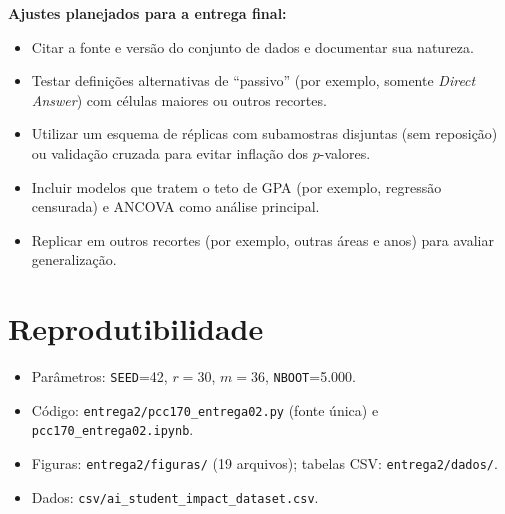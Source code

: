 \documentclass[12pt,a4paper]{article}
\begin{document}
\textbf{Ajustes planejados para a entrega final:}
\begin{itemize}
\item Citar a fonte e vers\~ao do conjunto de dados e documentar sua natureza.
\item Testar defini\c{c}\~oes alternativas de ``passivo'' (por exemplo, somente \emph{Direct Answer}) com c\'elulas maiores ou outros recortes.
\item Utilizar um esquema de r\'eplicas com subamostras disjuntas (sem reposi\c{c}\~ao) ou valida\c{c}\~ao cruzada para evitar infla\c{c}\~ao dos $p$-valores.
\item Incluir modelos que tratem o teto de GPA (por exemplo, regress\~ao censurada) e ANCOVA como an\'alise principal.
\item Replicar em outros recortes (por exemplo, outras \'areas e anos) para avaliar generaliza\c{c}\~ao.
\end{itemize}

\appendix
\section{Reprodutibilidade}
\begin{itemize}
\item Par\^ametros: \texttt{SEED}=42, $r=30$, $m=36$, \texttt{NBOOT}=5.000.
\item C\'odigo: \texttt{entrega2/pcc170\_entrega02.py} (fonte \'unica) e \texttt{pcc170\_entrega02.ipynb}.
\item Figuras: \texttt{entrega2/figuras/} (19 arquivos); tabelas CSV: \texttt{entrega2/dados/}.
\item Dados: \texttt{csv/ai\_student\_impact\_dataset.csv}.
\end{itemize}
\end{document}
